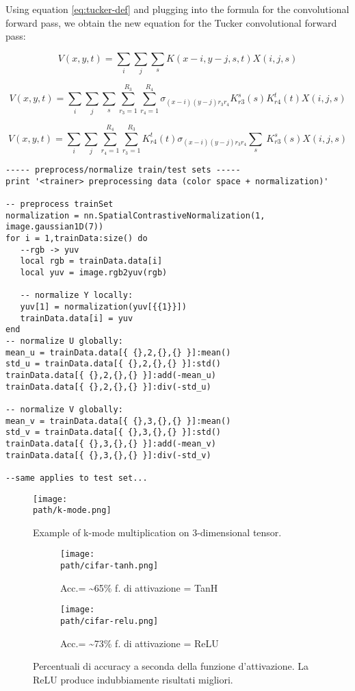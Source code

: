 Using equation \ref{eq:tucker-def} and plugging into the formula for the convolutional forward pass, we obtain the new equation for the Tucker convolutional forward pass: 

$$ V(x, y, t) = \sum_i \sum_j \sum_sK(x-i, y-j, s, t)X(i, j, s) $$

$$ V(x, y, t) = \sum_i \sum_j \sum_s\sum_{r_3=1}^{R_3}\sum_{r_4=1}^{R_4}\sigma_{(x-i)(y-j) r_3 r_4}K^s_{r3}(s)K^t_{r4}(t)X(i, j, s) $$

$$ V(x, y, t) = \sum_i \sum_j \sum_{r_4=1}^{R_4}\sum_{r_3=1}^{R_3}K^t_{r4}(t)\sigma_{(x-i)(y-j) r_3 r_4} \sum_s\ K^s_{r3}(s)X(i, j, s) $$ 



\begin{lstlisting}[language={[5.2]Lua}]
----- preprocess/normalize train/test sets -----
print '<trainer> preprocessing data (color space + normalization)'

-- preprocess trainSet
normalization = nn.SpatialContrastiveNormalization(1, image.gaussian1D(7))
for i = 1,trainData:size() do
   --rgb -> yuv
   local rgb = trainData.data[i]
   local yuv = image.rgb2yuv(rgb)
   
   -- normalize Y locally:
   yuv[1] = normalization(yuv[{{1}}])
   trainData.data[i] = yuv
end
-- normalize U globally:
mean_u = trainData.data[{ {},2,{},{} }]:mean()
std_u = trainData.data[{ {},2,{},{} }]:std()
trainData.data[{ {},2,{},{} }]:add(-mean_u)
trainData.data[{ {},2,{},{} }]:div(-std_u)

-- normalize V globally:
mean_v = trainData.data[{ {},3,{},{} }]:mean()
std_v = trainData.data[{ {},3,{},{} }]:std()
trainData.data[{ {},3,{},{} }]:add(-mean_v)
trainData.data[{ {},3,{},{} }]:div(-std_v)

--same applies to test set...
\end{lstlisting}



\begin{figure}[h!]
 \centering
 \texttt{[image: \\path/k-mode.png]} 
  \caption{Example of k-mode multiplication on 3-dimensional tensor.}
 \label{fig:k-mode}
\end{figure}

\bigskip

\begin{figure}
\centering
\begin{subfigure}{.5\textwidth}
  \centering
 \texttt{[image: \\path/cifar-tanh.png]} 
  \caption{Acc.= \textasciitilde 65\% f. di attivazione = TanH}
 \label{fig:training}
\end{subfigure}%
\begin{subfigure}{.5\textwidth}
  \centering
 \texttt{[image: \\path/cifar-relu.png]} 
  \caption{Acc.= \textasciitilde 73\% f. di attivazione = ReLU}
 \label{fig:validation}
\end{subfigure}
\caption{Percentuali di accuracy a seconda della funzione d'attivazione. La ReLU produce indubbiamente risultati migliori.}
\label{fig:relu}
\end{figure}
\\
\newpage
\pagebreak
\medskip
\newpage

